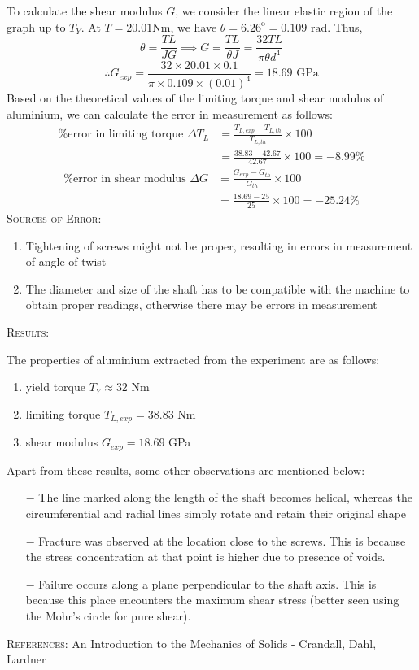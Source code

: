 \documentclass[a4paper, 11pt]{article}
\begin{document}
To calculate the shear modulus $G$, we consider the linear elastic region of the graph up to $T_Y$. At $T=20.01\text{Nm}$, we have $\theta=6.26^{\text{o}}=0.109\text{ rad}$. Thus,
$$\theta=\frac{TL}{JG}\implies G=\frac{TL}{\theta J}=\frac{32TL}{\pi \theta d^4}$$
$$\therefore G_{exp}=\frac{32\times 20.01\times 0.1}{\pi\times 0.109\times (0.01)^4}=18.69\text{ GPa}$$
Based on the theoretical values of the limiting torque and shear modulus of aluminium, we can calculate the error in measurement as follows:
\begin{align*}
\text{\% error in limiting torque }\Delta T_L&=\frac{T_{L,exp}-T_{L,th}}{T_{L,th}}\times 100\\
&=\frac{38.83-42.67}{42.67}\times 100=-8.99\%
\end{align*}
\begin{align*}
\text{\% error in shear modulus }\Delta G&=\frac{G_{exp}-G_{th}}{G_{th}}\times 100\\
&=\frac{18.69-25}{25}\times 100=-25.24\%
\end{align*}
\textsc{Sources of Error:}
\begin{enumerate}[label=\roman*)]
	\itemsep0em
	\item Tightening of screws might not be proper, resulting in errors in measurement of angle of twist
	\item The diameter and size of the shaft has to be compatible with the machine to obtain proper readings, otherwise there may be errors in measurement
\end{enumerate}
\textsc{Results:} 
\vspace{2mm}

The properties of aluminium extracted from the experiment are as follows:
	\begin{enumerate}[label=\roman*)]
		\itemsep0em
		\item yield torque $T_Y\approx 32$ Nm
		\item limiting torque $T_{L,exp}=38.83$ Nm
		\item shear modulus $G_{exp}=18.69$ GPa
	\end{enumerate}
Apart from these results, some other observations are mentioned below:
\begin{itemize}
		\itemsep0em
		\item[$-$] The line marked along the length of the shaft becomes helical, whereas the circumferential and radial lines simply rotate and retain their original shape
		\item[$-$] Fracture was observed at the location close to the screws. This is because the stress concentration at that point is higher due to presence of voids.
		\item[$-$] Failure occurs along a plane perpendicular to the shaft axis. This is because this place encounters the maximum shear stress (better seen using the Mohr's circle for pure shear).
\end{itemize}
\textsc{References:} An Introduction to the Mechanics of Solids - Crandall, Dahl, Lardner
\end{document}
